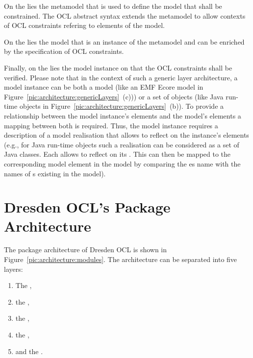 On the  lies the metamodel that is used to define the model
that shall be constrained. The OCL abstract syntax extends the metamodel to
allow contexts of OCL constraints refering to elements of the model.

On the  lies the model that is an instance of the metamodel
and can be enriched by the specification of OCL constraints.

Finally, on the  lies the model instance on that the OCL 
constraints shall be verified. Please note that in the context of such a
generic layer architecture, a model instance can be both a model (like an EMF 
Ecore model in Figure~\ref{pic:architecture:genericLayers}~(c))) or a set of 
objects (like Java run-time objects in
Figure~\ref{pic:architecture:genericLayers}~(b)). To provide a relationship
between the model instance's elements and the model's elements a mapping between
both is required. Thus, the model instance requires a description of a model
realisation that allows to reflect on the instance's elements (e.g., for Java
run-time objects such a realisation can be considered as a set of Java classes.
Each  allows to reflect on its .
This  can then be mapped to the corresponding model element in the
model by comparing the es name with the names of s
existing in the model).



\section{Dresden OCL's Package Architecture}

The package architecture of Dresden OCL is shown in
Figure~\ref{pic:architecture:modules}. The architecture can be separated into
five layers: 

\begin{enumerate}
  \item The ,
  \item the ,
  \item the ,
  \item the ,
  \item and the .
\end{enumerate}

